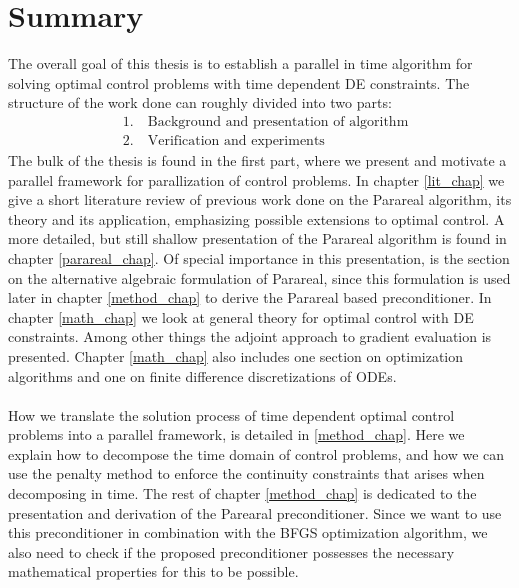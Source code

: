 \section{Summary}
The overall goal of this thesis is to establish a parallel in time algorithm for solving optimal control problems with time dependent DE constraints. The structure of the work done can roughly divided into two parts:
\begin{align*}
&1.\quad \textrm{Background and presentation of algorithm} \\
&2.\quad \textrm{Verification and experiments}
\end{align*}
The bulk of the thesis is found in the first part, where we present and motivate a parallel framework for parallization of control problems. In chapter \ref{lit_chap} we give a short literature review of previous work done on the Parareal algorithm, its theory and its application, emphasizing possible extensions to optimal control. A more detailed, but still shallow presentation of the Parareal algorithm is found in chapter \ref{parareal_chap}. Of special importance in this presentation, is the section on the alternative algebraic formulation of Parareal, since this formulation is used later in chapter \ref{method_chap} to derive the Parareal based preconditioner. In chapter \ref{math_chap} we look at general theory for optimal control with DE constraints. Among other things the adjoint approach to gradient evaluation is presented. Chapter \ref{math_chap} also includes one section on optimization algorithms and one on finite difference discretizations of ODEs.
\\
\\
How we translate the solution process of time dependent optimal control problems into a parallel framework, is detailed in \ref{method_chap}. Here we explain how to decompose the time domain of control problems, and how we can use the penalty method to enforce the continuity constraints that arises when decomposing in time. The rest of chapter \ref{method_chap} is dedicated to the presentation and derivation of the Parearal preconditioner. Since we want to use this preconditioner in combination with the BFGS optimization algorithm, we also need to check if the proposed preconditioner possesses the necessary mathematical properties for this to be possible. 
\\
\\
